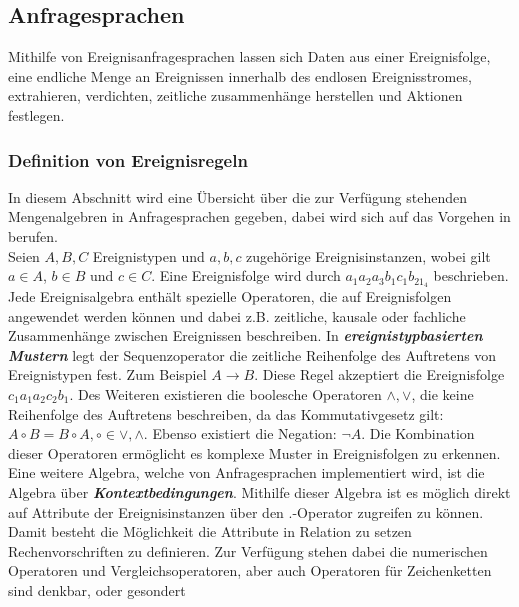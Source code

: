 \documentclass{acm_proc_article-sp}
\begin{document}
%
%
\subsection{Anfragesprachen}\label{kap:anfragesprachen}
\vspace{0.1cm}
Mithilfe von Ereignisanfragesprachen lassen sich Daten aus einer Ereignisfolge, eine 
endliche Menge an Ereignissen innerhalb des endlosen Ereignisstromes, extrahieren, 
verdichten, zeitliche zusammenhänge herstellen und Aktionen festlegen.

\subsubsection{Definition von Ereignisregeln}\label{kap:ereignisregeln}
\vspace{0.1cm}
In diesem Abschnitt wird eine Übersicht über die zur Verfügung stehenden Mengenalgebren 
in Anfragesprachen gegeben, dabei wird sich auf das Vorgehen in \cite{bruns} berufen.\\
Seien $A,B,C$ Ereignistypen und $a,b,c$ zugehörige Ereignisinstanzen, wobei gilt 
$a \in A$, $b \in B$ und $c \in C$. Eine Ereignisfolge wird durch $a_1a_2a_3b_1c_1b_21_4$
beschrieben.\\
Jede Ereignisalgebra enthält spezielle Operatoren, die auf Ereignisfolgen angewendet 
werden können und dabei z.B. zeitliche, kausale oder fachliche Zusammenhänge zwischen 
Ereignissen beschreiben. In \textbf{\textit{ereignistypbasierten Mustern}} legt der 
Sequenzoperator die zeitliche Reihenfolge des Auftretens von Ereignistypen fest. Zum 
Beispiel $A \rightarrow B$. Diese Regel akzeptiert die Ereignisfolge $c_1a_1a_2c_2b_1$. 
Des Weiteren existieren die boolesche Operatoren $\land , \lor$, die keine Reihenfolge 
des Auftretens beschreiben, da das Kommutativgesetz gilt: $A \circ B = B \circ A, \circ 
\in {\lor,\land}$. Ebenso existiert die Negation: $\neg A$. Die Kombination dieser 
Operatoren ermöglicht es komplexe Muster in Ereignisfolgen zu erkennen.\\
Eine weitere Algebra, welche von Anfragesprachen implementiert wird, ist die Algebra über 
\textbf{\textit{Kontextbedingungen}}. Mithilfe dieser Algebra ist es möglich direkt 
auf Attribute der Ereignisinstanzen über den $.$-Operator zugreifen zu können. Damit 
besteht die Möglichkeit die Attribute in Relation zu setzen Rechenvorschriften zu 
definieren. Zur Verfügung stehen dabei die numerischen Operatoren und 
Vergleichsoperatoren, aber auch Operatoren für Zeichenketten sind denkbar, oder gesondert 
\end{document}

